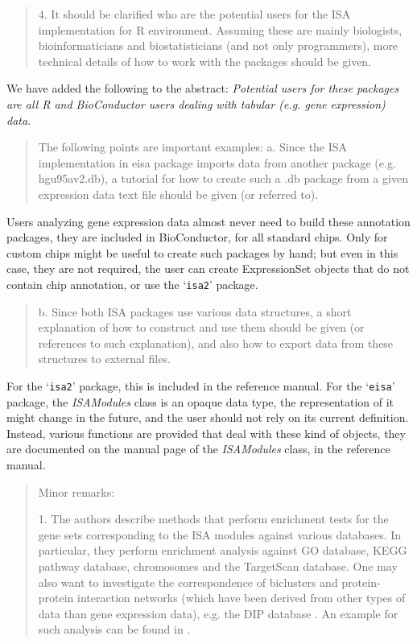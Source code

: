 \documentclass[a4paper]{article}
\newcommand{\Rpackage}[1]{`\texttt{#1}'}
\newcommand{\Rclass}[1]{\textsl{#1}}
\begin{document}
\begin{quote}
4.      It should be clarified who are the potential users for the ISA
implementation for R environment. Assuming these are mainly
biologists, bioinformaticians and biostatisticians (and not only
programmers), more technical details of how to work with the packages
should be given.
\end{quote}

We have added the following to the abstract:
\textsl{
Potential users for these packages are all R and
BioConductor users dealing with tabular (e.g. gene expression) data.
}

\begin{quote}
The following points are important examples: 
a.      Since the ISA implementation in eisa package imports data from
another package (e.g. hgu95av2.db), a tutorial for how to create such
a .db package from a given expression data text file should be given
(or referred to). 
\end{quote}

Users analyzing gene expression data almost never need to build
these annotation packages, they are included in BioConductor, for all
standard chips. Only for custom chips might be useful to create such
packages by hand; but even in this case, they are not required, the
user can create ExpressionSet objects that do not contain chip
annotation, or use the \Rpackage{isa2} package.

\begin{quote}
b.      Since both ISA packages use various data structures, a short
explanation of how to construct and use them should be given (or
references to such explanation), and also how to export data from
these structures to external files. 
\end{quote}

For the \Rpackage{isa2} package, this is included in the reference
manual. For the \Rpackage{eisa} package, the \Rclass{ISAModules} class
is an opaque data type, the representation of it might change in the
future, and the user should not rely on its current
definition. Instead, various functions are provided that deal with
these kind of objects, they are documented on the manual page of the
\Rclass{ISAModules} class, in the reference manual.

\begin{quote}
Minor remarks:

1.      The authors describe methods that perform enrichment tests for
the gene sets corresponding to the ISA modules against various
databases. In particular, they perform enrichment analysis against GO
database, KEGG pathway database, chromosomes and the TargetScan \citep{targetscan}
database. One may also want to investigate the correspondence of
biclusters and protein-protein interaction networks (which have been
derived from other types of data than gene expression data), e.g. the
DIP database \citep{salwinski04}. An example for such analysis can be
found in \citet{prelic06}.
\end{quote}
\end{document}

